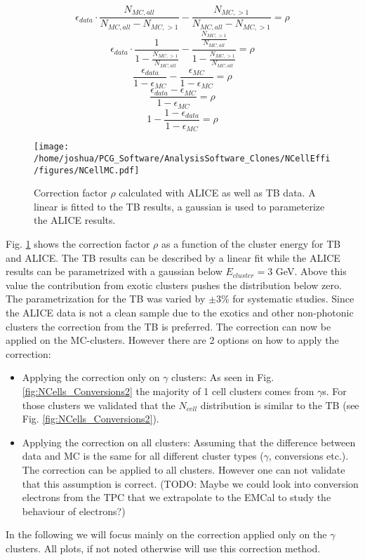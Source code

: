 \documentclass[ALICE]{ALICE_analysis_notes}
\begin{document}
\begin{equation}
\epsilon_{data} \cdot \frac{N_{MC, all}}{N_{MC, all} - N_{MC, >1}} - \frac{N_{MC, >1}}{N_{MC, all} - N_{MC, >1}} =  \rho
\end{equation}
\begin{equation}
\epsilon_{data} \cdot \frac{1}{ 1 - \frac{N_{MC, >1}}{N_{MC, all}}} - \frac{\frac{N_{MC, >1}}{N_{MC, all}}}{1 - \frac{N_{MC, >1}}{N_{MC, all}}} =  \rho
\end{equation}
\begin{equation}
\frac{\epsilon_{data}}{1 - \epsilon_{MC}} - \frac{\epsilon_{MC}}{1 - \epsilon_{MC}} =  \rho
\end{equation}
\begin{equation}
\frac{\epsilon_{data} - \epsilon_{MC}}{1 - \epsilon_{MC}} =  \rho
\end{equation}
\begin{equation}
1 - \frac{ 1 - \epsilon_{data} }{1 - \epsilon_{MC}} =  \rho
\end{equation}


\begin{figure}[t]
	\centering
	\texttt{[image: /home/joshua/PCG\_Software/AnalysisSoftware\_Clones/NCellEffi/figures/NCellMC.pdf]}
	\caption{Correction factor $\rho$ calculated with ALICE as well as TB data. A linear is fitted to the TB results, a gaussian is used to parameterize the ALICE results.}
	\label{fig:NCells_Rho}
\end{figure}

Fig. \ref{fig:NCells_Rho} shows the correction factor $\rho$ as a function of the cluster energy for TB and ALICE. The TB results can be described by a linear fit while the ALICE results can be parametrized with a gaussian below $E_{cluster} = 3$ GeV. Above this value the contribution from exotic clusters pushes the distribution below zero. The parametrization for the TB was varied by $\pm 3\%$ for systematic studies.
Since the ALICE data is not a clean sample due to the exotics and other non-photonic clusters the correction from the TB is preferred. 
The correction can now be applied on the MC-clusters. However there are 2 options on how to apply the correction:
\begin{itemize}
	\item Applying the correction only on $\gamma$ clusters: As seen in Fig. \ref{fig:NCells_Conversions2} the majority of 1 cell clusters comes from $\gamma$s. For those clusters we validated that the $N_{cell}$ distribution is similar to the TB (see Fig. \ref{fig:NCells_Conversions2}). 
	\item Applying the correction on all clusters: Assuming that the difference between data and MC is the same for all different cluster types ($\gamma$, conversions etc.). The correction can be applied to all clusters. However one can not validate that this assumption is correct. (TODO: Maybe we could look into conversion electrons from the TPC that we extrapolate to the EMCal to study the behaviour of electrons?)
\end{itemize}
In the following we will focus mainly on the correction applied only on the $\gamma$ clusters. All plots, if not noted otherwise will use this correction method. 
\end{document}
